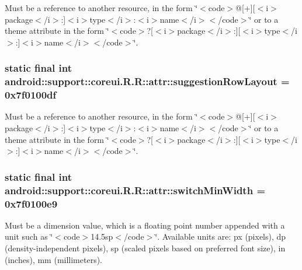 Must be a reference to another resource, in the form \char`\"{}$<$code$>$@\mbox{[}+\mbox{]}\mbox{[}$<$i$>$package$<$/i$>$:\mbox{]}$<$i$>$type$<$/i$>$:$<$i$>$name$<$/i$>$$<$/code$>$\char`\"{} or to a theme attribute in the form \char`\"{}$<$code$>$?\mbox{[}$<$i$>$package$<$/i$>$:\mbox{]}\mbox{[}$<$i$>$type$<$/i$>$:\mbox{]}$<$i$>$name$<$/i$>$$<$/code$>$\char`\"{}. \hypertarget{classandroid_1_1support_1_1coreui_1_1_r_1_1attr_70a28a4d79680001115e23ca8bde13c2}{
\subsubsection[{suggestionRowLayout}]{\setlength{\rightskip}{0pt plus 5cm}static final int android::support::coreui.R.R::attr::suggestionRowLayout = 0x7f0100df}}
\label{classandroid_1_1support_1_1coreui_1_1_r_1_1attr_70a28a4d79680001115e23ca8bde13c2}


Must be a reference to another resource, in the form \char`\"{}$<$code$>$@\mbox{[}+\mbox{]}\mbox{[}$<$i$>$package$<$/i$>$:\mbox{]}$<$i$>$type$<$/i$>$:$<$i$>$name$<$/i$>$$<$/code$>$\char`\"{} or to a theme attribute in the form \char`\"{}$<$code$>$?\mbox{[}$<$i$>$package$<$/i$>$:\mbox{]}\mbox{[}$<$i$>$type$<$/i$>$:\mbox{]}$<$i$>$name$<$/i$>$$<$/code$>$\char`\"{}. \hypertarget{classandroid_1_1support_1_1coreui_1_1_r_1_1attr_9f0dd9081a11a87099ff7b60a4e4a86a}{
\subsubsection[{switchMinWidth}]{\setlength{\rightskip}{0pt plus 5cm}static final int android::support::coreui.R.R::attr::switchMinWidth = 0x7f0100e9}}
\label{classandroid_1_1support_1_1coreui_1_1_r_1_1attr_9f0dd9081a11a87099ff7b60a4e4a86a}


Must be a dimension value, which is a floating point number appended with a unit such as \char`\"{}$<$code$>$14.5sp$<$/code$>$\char`\"{}. Available units are: px (pixels), dp (density-independent pixels), sp (scaled pixels based on preferred font size), in (inches), mm (millimeters). 

